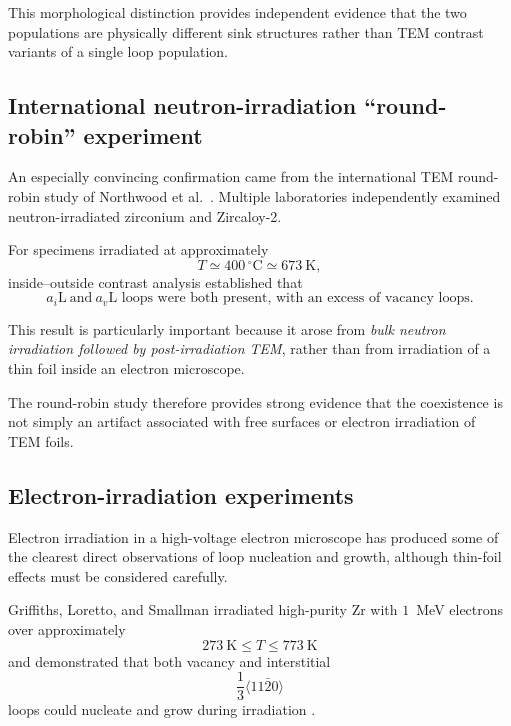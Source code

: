 \documentclass{article}
\newcommand{\aiL}{a_{i}\mathrm{L}}
\newcommand{\avL}{a_{v}\mathrm{L}}
\begin{document}
This morphological distinction provides independent evidence that the two
populations are physically different sink structures rather than TEM contrast
variants of a single loop population.

\subsection{International neutron-irradiation ``round-robin'' experiment}

An especially convincing confirmation came from the international TEM
round-robin study of Northwood et al.\ \citep{northwood1979characterization}.
Multiple laboratories independently examined neutron-irradiated zirconium and
Zircaloy-2.

For specimens irradiated at approximately
\begin{equation}
    T\simeq400\,^{\circ}\mathrm C
    \simeq673~\mathrm K,
\end{equation}
inside--outside contrast analysis established that
\begin{equation}
    \boxed{
    \aiL\ \text{and}\ \avL
    \text{ loops were both present, with an excess of vacancy loops}.
    }
\end{equation}

This result is particularly important because it arose from \emph{bulk neutron
irradiation followed by post-irradiation TEM}, rather than from irradiation of a
thin foil inside an electron microscope.

The round-robin study therefore provides strong evidence that the coexistence is
not simply an artifact associated with free surfaces or electron irradiation of
TEM foils.

\subsection{Electron-irradiation experiments}

Electron irradiation in a high-voltage electron microscope has produced some of
the clearest direct observations of loop nucleation and growth, although
thin-foil effects must be considered carefully.

Griffiths, Loretto, and Smallman irradiated high-purity Zr with $1$~MeV
electrons over approximately
\begin{equation}
    273~\mathrm K
    \leq T
    \leq
    773~\mathrm K
\end{equation}
and demonstrated that both vacancy and interstitial
\begin{equation}
    \frac13\langle11\bar20\rangle
\end{equation}
loops could nucleate and grow during irradiation
\citep{griffiths1983electron1}.
\end{document}
